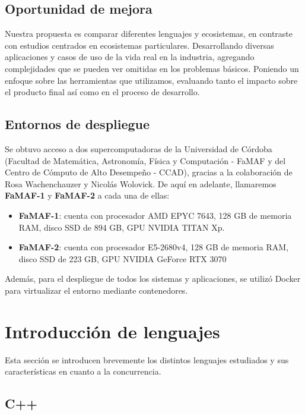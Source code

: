 \documentclass[11pt]{article}
\let\Oldsection\section
\renewcommand{\section}{\FloatBarrier\Oldsection}
\let\Oldsubsection\subsection
\renewcommand{\subsection}{\FloatBarrier\Oldsubsection}
\begin{document}
\subsection{Oportunidad de mejora}

Nuestra propuesta es comparar diferentes lenguajes y ecosistemas, en contraste con estudios centrados en ecosistemas particulares.
Desarrollando diversas aplicaciones y casos de uso de la vida real en la industria, agregando complejidades que se pueden ver omitidas en los problemas básicos.
Poniendo un enfoque sobre las herramientas que utilizamos, evaluando tanto el impacto sobre el producto final así como en el proceso de desarrollo.

\subsection{Entornos de despliegue} \label{sec:deploy_envs}

Se obtuvo acceso a dos supercomputadoras de la Universidad de Córdoba (Facultad de Matemática, Astronomía, Física y Computación - FaMAF y del Centro de Cómputo de Alto Desempeño - CCAD), gracias a la colaboración de Rosa Wachenchauzer y Nicolás Wolovick. De aquí en adelante, llamaremos \textbf{FaMAF-1} y \textbf{FaMAF-2} a cada una de ellas:

\begin{itemize}
    \item \textbf{FaMAF-1}: cuenta con procesador AMD EPYC 7643, 128 GB de memoria RAM, disco SSD de 894 GB, GPU NVIDIA TITAN Xp.
    \item \textbf{FaMAF-2}: cuenta con procesador E5-2680v4, 128 GB de memoria RAM, disco SSD de 223 GB, GPU NVIDIA GeForce RTX 3070
\end{itemize}

Además, para el despliegue de todos los sistemas y aplicaciones, se utilizó Docker \cite{com:docker} para virtualizar el entorno mediante contenedores.

\newpage

\section{Introducción de lenguajes}

Esta sección se introducen brevemente los distintos lenguajes estudiados y sus características en cuanto a la concurrencia.

\subsection{C++}
\end{document}
